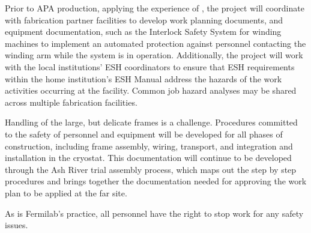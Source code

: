 Prior to APA production, applying the experience of , the project will coordinate with fabrication partner facilities to develop work planning documents, and equipment documentation, such as the Interlock Safety System for  winding machines to implement an automated protection against personnel contacting the winding arm while the system is in operation. Additionally, the project will work with the local institutions' ESH coordinators to ensure that ESH requirements within the home institution's ESH Manual address the hazards of the work activities occurring at the facility. Common job hazard analyses may be shared across multiple fabrication facilities.   

Handling of the large, but delicate frames is a challenge. Procedures committed to the safety of personnel and equipment will be developed for all phases of construction, including frame assembly, wiring, transport, and integration and installation in the cryostat. This documentation will continue to be developed through the Ash River trial assembly process, which maps out the step by step procedures and brings together the documentation needed for approving the work plan to be applied at the far site. 

As is Fermilab's practice, all personnel have the right to stop work for any safety issues.
